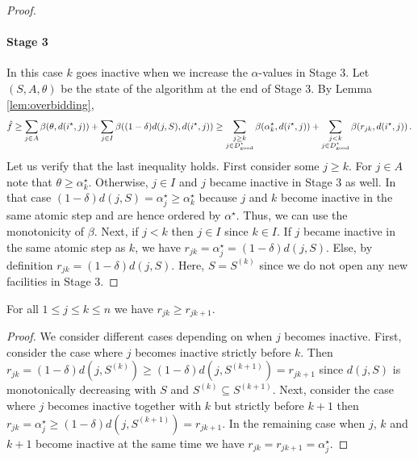 \begin{proof}
    \paragraph{Stage 3}
    In this case $k$ goes inactive when we increase the $\alpha$-values in Stage 3. Let $(S,A,\theta)$ be the state of the algorithm at the end of Stage 3. By Lemma \ref{lem:overbidding},
    \[
        \hat f \ge \sum_{j \in A} \beta(\theta, d(i^\star,j)) + \sum_{j \in I} \beta((1-\delta)d(j, S), d(i^\star,j))  \ge \sum_{\substack{j \ge k\\ j \in D^\star_{\mathrm{good}}}} \beta(\alpha^\star_k,  d(i^\star,j)) + \sum_{\substack{j < k\\ j \in D^\star_{\mathrm{good}}}} \beta(r_{jk}, d(i^\star,j))\,.
    \]
    Let us verify that the last inequality holds. First consider some $j \ge k$. For $j \in A$ note that $\theta \ge \alpha^\star_k$. Otherwise, $j \in I$ and $j$ became inactive in Stage 3 as well. In that case $(1-\delta)d(j,S) = \alpha^\star_j \ge \alpha^\star_k$ because $j$ and $k$ become inactive in the same atomic step and are hence ordered by $\alpha^\star$. Thus, we can use the monotonicity of $\beta$. Next, if $j < k$ then $j \in I$ since $k \in I$.
    If $j$ became inactive in the same atomic step as $k$, we have $r_{jk} = \alpha_j^\star = (1-\delta)d(j, S)$.
    Else, by definition $r_{jk} = (1-\delta)d(j, S)$. Here, $S = S^{(k)}$ since we do not open any new facilities in Stage 3. 
\end{proof}

\begin{lemma}
\label{lem:fr-r-mono}
    For all $1 \le j \leq k \le n$ we have $r_{jk} \ge r_{j k+1}$.
\end{lemma}
\begin{proof}
    We consider different cases depending on when $j$ becomes inactive.
    First, consider the case where $j$ becomes inactive strictly before $k$.
    Then $r_{jk} = (1-\delta)d(j,S^{(k)}) \ge (1-\delta)d(j,S^{(k+1)}) = r_{jk+1}$ since $d(j, S)$ is monotonically decreasing with $S$ and $S^{(k)} \subseteq S^{(k+1)}$.
    Next, consider the case where $j$ becomes inactive together with $k$ but strictly before $k+1$ then $r_{jk} = \alpha^\star_j \ge (1-\delta)d(j,S^{(k+1)}) = r_{jk+1}$.
    In the remaining case when $j$, $k$ and $k+1$ become inactive at the same time we have $r_{jk} = r_{jk+1} = \alpha^\star_j$.  
\end{proof}

